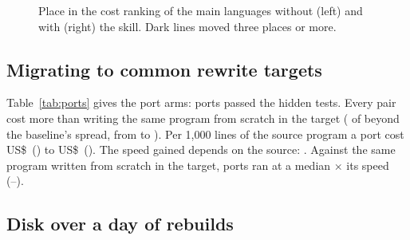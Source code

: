 \documentclass[11pt,a4paper]{article}
\begin{document}
\begin{table}[h]
\centering\small
\caption{With vs without a language skill, per language, summing the per-task medians over the tasks
both runs share. Works: runs that passed the hidden tests in round 3 or after repair. $^{\sim}$: within the
baseline's spread between repetitions. Used: runs in which the agent invoked the skill. Pays off: cost of
writing the skill divided by the median saving per run, only for savings outside that spread.}
\label{tab:skills}
\SkillTable
\end{table}

\begin{figure}[h]
\centering\SkillSlope
\caption{Place in the cost ranking of the main languages without (left) and with (right) the skill.
Dark lines moved three places or more.}
\label{fig:skillslope}
\end{figure}

\subsection{Migrating to common rewrite targets}

Table~\ref{tab:ports} gives the port arms: \PortWorks{} ports passed the hidden tests. Every pair cost more
than writing the same program from scratch in the target (\NPortCostlier{} of \NPortPairs{} beyond the
baseline's spread, from \PortDeltaMin{} to \PortDeltaMax). Per 1,000 lines of the source program a port
cost US\$\,\PortPerKMin{} (\PortPerKMinPair) to US\$\,\PortPerKMax{} (\PortPerKMaxPair). The speed
gained depends on the source: \PortSpeedBySource. Against the same program written from scratch in the
target, ports ran at a median \PortVsScratchMedian$\times$ its speed (\PortVsScratchMin--\PortVsScratchMax).

\begin{table}[h]
\centering\small
\caption{Port arms: the agent ports the baseline's working solution in one language (rows) to a target
(columns). Each cell: US\$ per 1,000 lines of the source program (write + repair, median of runs) \textbar{}
the port's speed relative to the source (geometric mean over the four tasks, timed in one session; below 1
the port is slower). Every pair cost more than writing the program from scratch in the target
(\PortDeltaMin{} to \PortDeltaMax).}
\label{tab:ports}
\PortTable
\end{table}

\subsection{Disk over a day of rebuilds}
\end{document}

